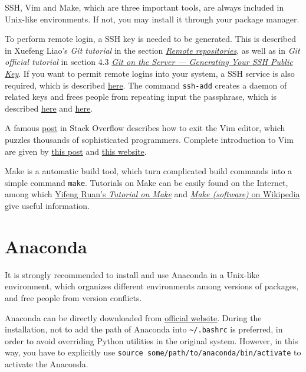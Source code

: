 \documentclass[english]{../TeXTemplate/pkupaper}
\begin{document}
SSH, Vim and Make, which are three important tools, are always included in Unix-like environments. If not, you may install it through your package manager.

To perform remote login, a SSH key is needed to be generated. This is described in Xuefeng Liao's \emph{Git tutorial} in the section \href{https://www.liaoxuefeng.com/wiki/0013739516305929606dd18361248578c67b8067c8c017b000/001374385852170d9c7adf13c30429b9660d0eb689dd43a000}{\emph{Remote repositories}}, as well as in \emph{Git official tutorial} in section 4.3 \href{https://git-scm.com/book/en/v2/Git-on-the-Server-Generating-Your-SSH-Public-Key}{\emph{Git on the Server --- Generating Your SSH Public Key}}. If you want to permit remote logins into your system, a SSH service is also required, which is described \href{http://www.linuxidc.com/Linux/2010-02/24349.htm}{here}. The command \verb"ssh-add" creates a daemon of related keys and frees people from repeating input the passphrase, which is described \href{http://blog.csdn.net/vizts/article/details/47043695}{here} and \href{https://www.cnblogs.com/kex1n/p/5229493.html}{here}.

A famous \href{https://stackoverflow.com/questions/11828270/how-to-exit-the-vim-editor}{post} in Stack Overflow describes how to exit the Vim editor, which puzzles thousands of sophisticated programmers. Complete introduction to Vim are given by \href{http://www.jianshu.com/p/bcbe916f97e1}{this post} and \href{https://blog.interlinked.org/tutorials/vim_tutorial.html}{this website}.

Make is a automatic build tool, which turn complicated build commands into a simple command \verb"make". Tutorials on Make can be easily found on the Internet, among which \href{http://www.ruanyifeng.com/blog/2015/02/make.html}{Yifeng Ruan's \emph{Tutorial on Make}} and \href{https://en.wikipedia.org/wiki/Make_(software)}{\emph{Make (software)} on Wikipedia} give useful information.

\section{Anaconda}

It is strongly recommended to install and use Anaconda in a Unix-like environment, which organizes different environments among versions of packages, and free people from version conflicts.

Anaconda can be directly downloaded from \href{https://www.anaconda.com/download/}{official website}. During the installation, not to add the path of Anaconda into \verb"~/.bashrc" is preferred, in order to avoid overriding Python utilities in the original system. However, in this way, you have to explicitly use \verb"source some/path/to/anaconda/bin/activate" to activate the Anaconda.
\end{document}
